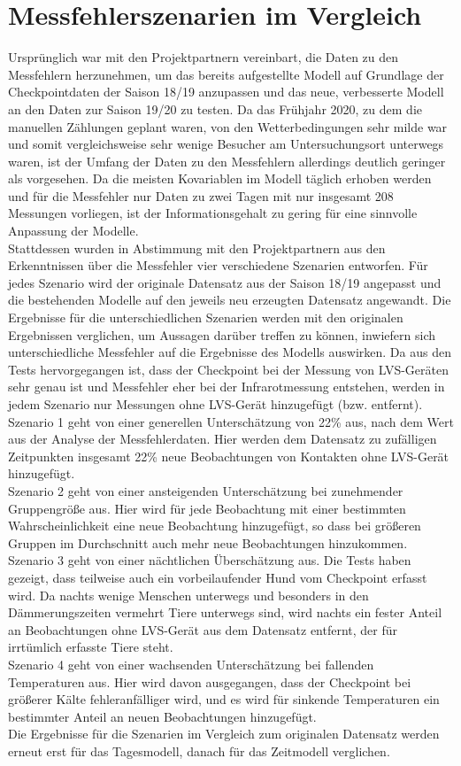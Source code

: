 \documentclass[12pt]{scrreprt}
\begin{document}
\section{Messfehlerszenarien im Vergleich}
Ursprünglich war mit den Projektpartnern vereinbart, die Daten zu den Messfehlern herzunehmen, um das bereits aufgestellte Modell auf Grundlage der Checkpointdaten der Saison 18/19 anzupassen und das neue, verbesserte Modell an den Daten zur Saison 19/20 zu testen. Da das Frühjahr 2020, zu dem die manuellen Zählungen geplant waren, von den Wetterbedingungen sehr milde war und somit vergleichsweise sehr wenige Besucher am Untersuchungsort unterwegs waren, ist der Umfang der Daten zu den Messfehlern allerdings deutlich geringer als vorgesehen. Da die meisten Kovariablen im Modell täglich erhoben werden und für die Messfehler nur Daten zu zwei Tagen mit nur insgesamt 208 Messungen vorliegen, ist der Informationsgehalt zu gering für eine sinnvolle Anpassung der Modelle. \\
Stattdessen wurden in Abstimmung mit den Projektpartnern aus den Erkenntnissen über die Messfehler vier verschiedene Szenarien entworfen. Für jedes Szenario wird der originale Datensatz aus der Saison 18/19 angepasst und die bestehenden Modelle auf den jeweils neu erzeugten Datensatz angewandt. Die Ergebnisse für die unterschiedlichen Szenarien werden mit den originalen Ergebnissen verglichen, um Aussagen darüber treffen zu können, inwiefern sich unterschiedliche Messfehler auf die Ergebnisse des Modells auswirken. Da aus den Tests hervorgegangen ist, dass der Checkpoint bei der Messung von LVS-Geräten sehr genau ist und Messfehler eher bei der Infrarotmessung entstehen, werden in jedem Szenario nur Messungen ohne LVS-Gerät hinzugefügt (bzw. entfernt). \\
Szenario 1 geht von einer generellen Unterschätzung von 22\% aus, nach dem Wert aus der Analyse der Messfehlerdaten. Hier werden dem Datensatz zu zufälligen Zeitpunkten insgesamt 22\% neue Beobachtungen von Kontakten ohne LVS-Gerät hinzugefügt. \\
Szenario 2 geht von einer ansteigenden Unterschätzung bei zunehmender Gruppengröße aus. Hier wird für jede Beobachtung mit einer bestimmten Wahrscheinlichkeit eine neue Beobachtung hinzugefügt, so dass bei größeren Gruppen im Durchschnitt auch mehr neue Beobachtungen hinzukommen. \\
Szenario 3 geht von einer nächtlichen Überschätzung aus. Die Tests haben gezeigt, dass teilweise auch ein vorbeilaufender Hund vom Checkpoint erfasst wird. Da nachts wenige Menschen unterwegs und besonders in den Dämmerungszeiten vermehrt Tiere unterwegs sind, wird nachts ein fester Anteil an Beobachtungen ohne LVS-Gerät aus dem Datensatz entfernt, der für irrtümlich erfasste Tiere steht. \\
Szenario 4 geht von einer wachsenden Unterschätzung bei fallenden Temperaturen aus. Hier wird davon ausgegangen, dass der Checkpoint bei größerer Kälte fehleranfälliger wird, und es wird für sinkende Temperaturen ein bestimmter Anteil an neuen Beobachtungen hinzugefügt. \\
Die Ergebnisse für die Szenarien im Vergleich zum originalen Datensatz werden erneut erst für das Tagesmodell, danach für das Zeitmodell verglichen.
\end{document}
